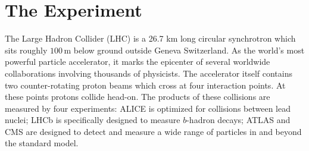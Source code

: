\chapter{The Experiment}

The Large Hadron Collider (LHC) is a 26.7 km long circular synchrotron which sits roughly $100\,\textrm{m}$ below ground outside Geneva Switzerland.
As the world's most powerful particle accelerator, it marks the epicenter of several worldwide collaborations involving thousands of physicists.
The accelerator itself contains two counter-rotating proton beams which cross at four interaction points. At these points protons collide head-on.
The products of these collisions are measured by four experiments: ALICE is optimized for collisions between lead nuclei; LHCb is specifically designed to measure $b$-hadron decays; ATLAS and CMS are designed to detect and measure a wide range of particles in and beyond the standard model.



\label{sec:lhc}


